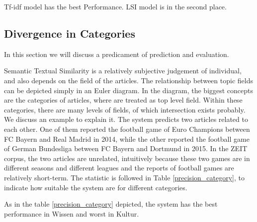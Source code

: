 Tf-idf model has the best Performance. LSI model is in the second place. 

\subsection{Divergence in Categories}

In this section we will discuss a predicament of prediction and evaluation. 

Semantic Textual Similarity is a relatively subjective judgement of individual, and also depends on the field of the articles. The relationship between topic fields can be depicted simply in an Euler diagram. In the diagram, the biggest concepts are the categories of articles, where are treated as top level field. Within these categories, there are many levels of fields, of which intersection exists probably. We discuss an example to explain it. The system predicts two articles related to each other. One of them reported the football game of Euro Champions between FC Bayern and Real Madrid in 2014, while the other reported the football game of German Bundesliga between FC Bayern and Dortmund in 2015. In the ZEIT corpus, the two articles are unrelated, intuitively because these two games are in different seasons and different leagues and the reports of football games are relatively short-term. The statistic is followed in Table \ref{precision_category}, to indicate how suitable the system are for different categories.

As in the table \ref{precision_category} depicted, the system has the best performance in Wissen and worst in Kultur. 

